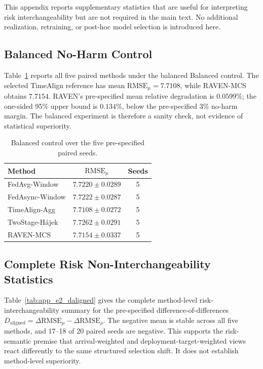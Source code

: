 This appendix reports supplementary statistics that are useful for interpreting
risk interchangeability but are not required in the main text.  No additional realization,
retraining, or post-hoc model selection is introduced here.

\subsection{Balanced No-Harm Control}
\label{app:e1_balanced}

Table~\ref{tab:app_e1_balanced} reports all five paired methods under the balanced
Balanced control.  The selected TimeAlign reference has mean
$\mathrm{RMSE}_\mu=7.7108$, while RAVEN-MCS obtains $7.7154$.  RAVEN's
pre-specified mean relative degradation is $0.0599\%$; the one-sided 95\%
upper bound is $0.134\%$, below the pre-specified $3\%$ no-harm margin.  The
balanced experiment is therefore a sanity check, not evidence of statistical
superiority.

\begin{table}[!t]
\centering
\caption{Balanced control over the five pre-specified paired seeds.}
\label{tab:app_e1_balanced}
\footnotesize
\setlength{\tabcolsep}{5pt}
\begin{tabular*}{\columnwidth}{@{\extracolsep{\fill}}lcc}
\toprule
Method & $\mathrm{RMSE}_\mu$ & Seeds\\
\midrule
FedAvg-Window & $7.7220\pm0.0289$ & 5 \\
FedAsync-Window & $7.7222\pm0.0287$ & 5 \\
TimeAlign-Agg & $7.7108\pm0.0272$ & 5 \\
TwoStage-H\'ajek & $7.7262\pm0.0291$ & 5 \\
RAVEN-MCS & $7.7154\pm0.0337$ & 5 \\
\bottomrule
\end{tabular*}
\end{table}

\subsection{Complete Risk Non-Interchangeability Statistics}
\label{app:e2_full_stats}

Table~\ref{tab:app_e2_daligned} gives the complete method-level risk-interchangeability summary for
the pre-specified difference-of-differences
$D_{\mathrm{aligned}}=\Delta\mathrm{RMSE}_{\mu}
-\Delta\mathrm{RMSE}_{\rho}$.  The negative mean is stable across all five
methods, and 17--18 of 20 paired seeds are negative.  This supports the
risk-semantic premise that arrival-weighted and deployment-target-weighted
views react differently to the same structured selection shift.  It does not
establish method-level superiority.


